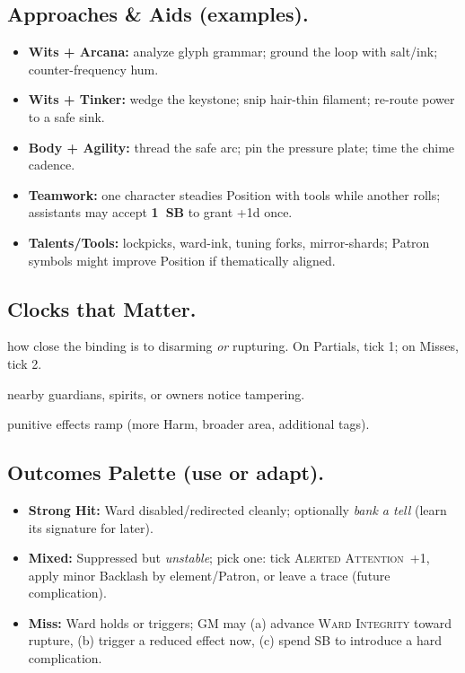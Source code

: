 \subsection{Approaches & Aids (examples).}
\begin{itemize}
\item \textbf{Wits + Arcana:} analyze glyph grammar; ground the loop with salt/ink; counter-frequency hum.
\item \textbf{Wits + Tinker:} wedge the keystone; snip hair-thin filament; re-route power to a safe sink.
\item \textbf{Body + Agility:} thread the safe arc; pin the pressure plate; time the chime cadence.
\item \textbf{Teamwork:} one character steadies Position with tools while another rolls; assistants may accept \textbf{1~SB} to grant +1d once.
\item \textbf{Talents/Tools:} lockpicks, ward-ink, tuning forks, mirror-shards; Patron symbols might improve Position if thematically aligned.
\end{itemize}

\subsection{Clocks that Matter.}
\begin{description}[leftmargin=1.6em]
\item[\textsc{Ward Integrity} (4):] how close the binding is to disarming \emph{or} rupturing. On Partials, tick 1; on Misses, tick 2.
\item[\textsc{Alerted Attention} (4):] nearby guardians, spirits, or owners notice tampering.
\item[\textsc{Escalation} (4/6):] punitive effects ramp (more Harm, broader area, additional tags).
\end{description}

\subsection{Outcomes Palette (use or adapt).}
\begin{itemize}
\item \textbf{Strong Hit:} Ward disabled/redirected cleanly; optionally \emph{bank a tell} (learn its signature for later).
\item \textbf{Mixed:} Suppressed but \emph{unstable}; pick one: tick \textsc{Alerted Attention}~+1, apply minor Backlash by element/Patron, or leave a trace (future complication).
\item \textbf{Miss:} Ward holds or triggers; GM may (a) advance \textsc{Ward Integrity} toward rupture, (b) trigger a reduced effect now, (c) spend SB to introduce a hard complication.
\end{itemize}

